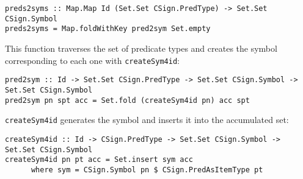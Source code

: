 {\codesize
\begin{verbatim}
preds2syms :: Map.Map Id (Set.Set CSign.PredType) -> Set.Set CSign.Symbol
preds2syms = Map.foldWithKey pred2sym Set.empty
\end{verbatim}
}

This function traverses the set of predicate types and creates the
symbol corresponding to each one with \verb"createSym4id":

{\codesize
\begin{verbatim}
pred2sym :: Id -> Set.Set CSign.PredType -> Set.Set CSign.Symbol -> Set.Set CSign.Symbol
pred2sym pn spt acc = Set.fold (createSym4id pn) acc spt
\end{verbatim}
}

\verb"createSym4id" generates the symbol and inserts it into the
accumulated set:

{\codesize
\begin{verbatim}
createSym4id :: Id -> CSign.PredType -> Set.Set CSign.Symbol -> Set.Set CSign.Symbol
createSym4id pn pt acc = Set.insert sym acc
      where sym = CSign.Symbol pn $ CSign.PredAsItemType pt
\end{verbatim}
}





















